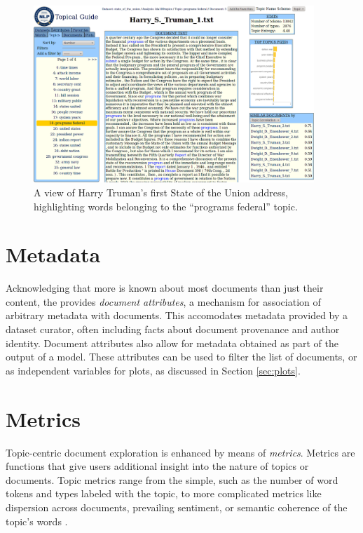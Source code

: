 \documentclass[11pt]{article}
\begin{document}
\begin{figure}[t]
 \centering
 \includegraphics[width=400px,keepaspectratio=true]{./topic_document_view.png}
 \caption{A view of Harry Truman's first State of the Union address, highlighting words belonging to the ``programs federal'' topic.}
 \label{fig:topic_doc}
\end{figure}

\section{Metadata}%
Acknowledging that more is known about most documents than just their content,
the \tool{} provides \textit{document attributes}, a mechanism for association
of arbitrary metadata with documents. This accomodates metadata
provided by a dataset curator, often including facts about document
provenance and author identity. Document attributes also allow for metadata
obtained as part of the output of a model. These attributes can be used to
filter the list of documents, or as independent variables for plots, as discussed in Section \ref{sec:plots}.

\section{Metrics}
Topic-centric document exploration is enhanced by means of \textit{metrics}.
Metrics are functions that give users additional insight into the nature of
topics or documents. Topic metrics range from the simple, such as the number of word tokens and types labeled with the
topic, to more complicated metrics like dispersion across documents,
prevailing sentiment, or semantic coherence of the topic's words \cite{Newman2010Coherence}.
\end{document}
